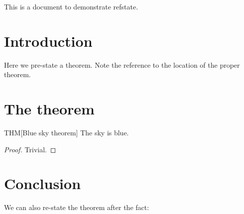 \documentclass{scrartcl}
\theoremstyle{plain}
\begin{document}
This is a document to demonstrate refstate.

\section{Introduction}

Here we pre-state a theorem. Note the reference to the location of the proper theorem.


\newpage

\section{The theorem}

\begin{store}{THM}[Blue sky theorem]\label{thmmain}
    The sky is blue.
\end{store}
\begin{proof}
    Trivial.
\end{proof}

\section{Conclusion}

We can also re-state the theorem after the fact:

\end{document}
